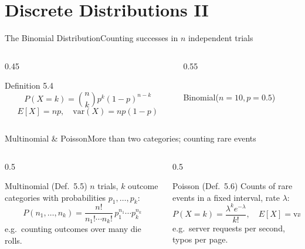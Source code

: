 \documentclass[aspectratio=169,11pt]{beamer}
\begin{document}
\section{Discrete Distributions II}

\begin{frame}{The Binomial Distribution}{Counting successes in $n$ independent trials}
  \begin{columns}[T]
    \begin{column}{0.45\textwidth}
      \begin{block}{Definition 5.4}
        \[ P(X=k) = \binom{n}{k}p^k(1-p)^{n-k} \]
        \[ E[X]=np, \quad \text{var}(X)=np(1-p) \]
      \end{block}
    \end{column}
    \begin{column}{0.55\textwidth}
      \centering
      \\
      \scriptsize Binomial($n{=}10,p{=}0.5$)
    \end{column}
  \end{columns}
\end{frame}

\begin{frame}{Multinomial \& Poisson}{More than two categories; counting rare events}
  \begin{columns}[T]
    \begin{column}{0.5\textwidth}
      \begin{block}{Multinomial (Def.\ 5.5)}
        \small $n$ trials, $k$ outcome categories with probabilities
        $p_1,\dots,p_k$:
        \[ P(n_1,\dots,n_k) = \frac{n!}{n_1!\cdots n_k!}\,p_1^{n_1}\cdots p_k^{n_k} \]
        \scriptsize e.g.\ counting outcomes over many die rolls.
      \end{block}
    \end{column}
    \begin{column}{0.5\textwidth}
      \begin{exampleblock}{Poisson (Def.\ 5.6)}
        \small Counts of rare events in a fixed interval, rate $\lambda$:
        \[ P(X=k) = \frac{\lambda^k e^{-\lambda}}{k!}, \quad E[X]=\text{var}(X)=\lambda \]
        \scriptsize e.g.\ server requests per second, typos per page.
      \end{exampleblock}
    \end{column}
  \end{columns}
\end{frame}
\end{document}
